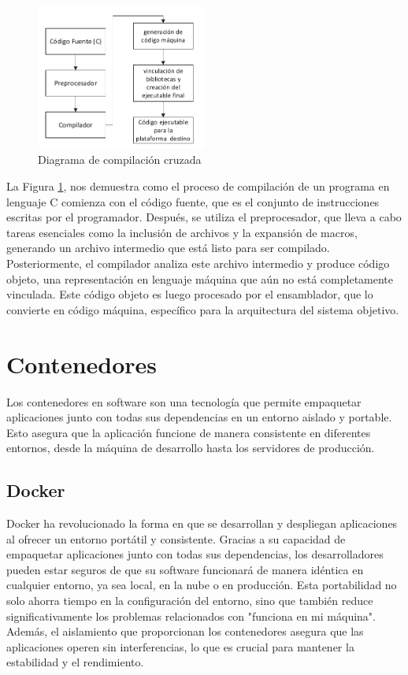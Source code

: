 \begin{figure}[h!]
    \centering
    \includegraphics[width=0.5\textwidth]{fig/teorico/Flujo de trabajo xcompiler.pdf}
    \caption{Diagrama de compilación cruzada}
    \label{fig:xcompile_workflow}
\end{figure}

La Figura \ref{fig:xcompile_workflow}, nos demuestra como el proceso de compilación de un programa en lenguaje C comienza con el código fuente, que es el conjunto de instrucciones escritas por el programador. Después, se utiliza el preprocesador, que lleva a cabo tareas esenciales como la inclusión de archivos y la expansión de macros, generando un archivo intermedio que está listo para ser compilado. Posteriormente, el compilador analiza este archivo intermedio y produce código objeto, una representación en lenguaje máquina que aún no está completamente vinculada. Este código objeto es luego procesado por el ensamblador, que lo convierte en código máquina, específico para la arquitectura del sistema objetivo.

\section{Contenedores}\label{sec:containers}

Los contenedores en software son una tecnología que permite empaquetar aplicaciones junto con todas sus dependencias en un entorno aislado y portable. Esto asegura que la aplicación funcione de manera consistente en diferentes entornos, desde la máquina de desarrollo hasta los servidores de producción.

\subsection{Docker}

Docker ha revolucionado la forma en que se desarrollan y despliegan aplicaciones al ofrecer un entorno portátil y consistente. Gracias a su capacidad de empaquetar aplicaciones junto con todas sus dependencias, los desarrolladores pueden estar seguros de que su software funcionará de manera idéntica en cualquier entorno, ya sea local, en la nube o en producción. Esta portabilidad no solo ahorra tiempo en la configuración del entorno, sino que también reduce significativamente los problemas relacionados con "funciona en mi máquina". Además, el aislamiento que proporcionan los contenedores asegura que las aplicaciones operen sin interferencias, lo que es crucial para mantener la estabilidad y el rendimiento.

